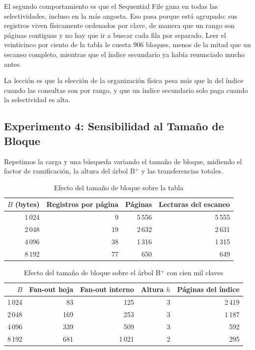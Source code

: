 \documentclass[a4paper,12pt]{article}
\begin{document}
El segundo comportamiento es que el Sequential File gana en todas las
selectividades, incluso en la más angosta. Eso pasa porque está agrupado: sus
registros viven físicamente ordenados por clave, de manera que un rango son
páginas contiguas y no hay que ir a buscar cada fila por separado. Leer el
veinticinco por ciento de la tabla le cuesta 906 bloques, menos de la mitad que
un escaneo completo, mientras que el índice secundario ya había renunciado
mucho antes.

La lección es que la elección de la organización física pesa más que la del
índice cuando las consultas son por rango, y que un índice secundario solo paga
cuando la selectividad es alta.

\subsection{Experimento 4: Sensibilidad al Tamaño de Bloque}

Repetimos la carga y una búsqueda variando el tamaño de bloque, midiendo el
factor de ramificación, la altura del árbol B$^+$ y las transferencias totales.

\begin{table}[H]
\centering
\caption{Efecto del tamaño de bloque sobre la tabla}
\begin{tabular}{@{}rrrr@{}}
\toprule
\textbf{$B$ (bytes)} & \textbf{Registros por página} & \textbf{Páginas} & \textbf{Lecturas del escaneo} \\
\midrule
1\,024 & 9 & 5\,556 & 5\,555 \\
2\,048 & 19 & 2\,632 & 2\,631 \\
4\,096 & 38 & 1\,316 & 1\,315 \\
8\,192 & 77 & 650 & 649 \\
\bottomrule
\end{tabular}
\end{table}

\begin{table}[H]
\centering
\caption{Efecto del tamaño de bloque sobre el árbol B$^+$ con cien mil claves}
\begin{tabular}{@{}rrrrr@{}}
\toprule
\textbf{$B$} & \textbf{Fan-out hoja} & \textbf{Fan-out interno} & \textbf{Altura $h$} & \textbf{Páginas del índice} \\
\midrule
1\,024 & 83 & 125 & 3 & 2\,419 \\
2\,048 & 169 & 253 & 3 & 1\,187 \\
4\,096 & 339 & 509 & 3 & 592 \\
8\,192 & 681 & 1\,021 & 2 & 295 \\
\bottomrule
\end{tabular}
\end{table}
\end{document}
